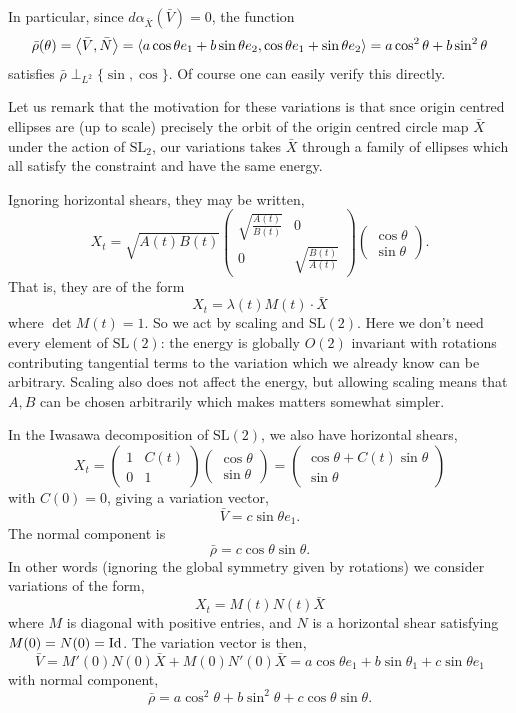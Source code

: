 \documentclass[12pt]{article}
\begin{document}
In particular, since \(d\alpha_{\bar{X}} (\bar{V}) = 0\), the function
\[
\bar{\rho} (\theta) = \left\langle{\bar{V}},{\bar{N}}\right\rangle = \left\langle{a \cos\theta e_1 + b \sin\theta e_2},{\cos\theta e_1 + \sin\theta e_2}\right\rangle = a \cos^2\theta + b \sin^2\theta
\]
satisfies \(\bar{\rho} \perp_{L^2} \{\sin, \cos\}\). Of course one can easily verify this directly.

Let us remark that the motivation for these variations is that snce origin centred ellipses are (up to scale) precisely the orbit of the origin centred circle map \(\bar{X}\) under the action of \(\text{SL}_2\), our variations takes \(\bar{X}\) through a family of ellipses which all satisfy the constraint and have the same energy.

Ignoring horizontal shears, they may be written,
\[
X_t = \sqrt{A(t) B(t)}
\begin{pmatrix}
\sqrt{\frac{A(t)}{B(t)}} & 0 \\
0 & \sqrt{\frac{B(t)}{A(t)}}
\end{pmatrix}
\begin{pmatrix}
\cos \theta \\
\sin \theta
\end{pmatrix}.
\]
That is, they are of the form
\[
X_t = \lambda(t) M(t) \cdot \bar{X}
\]
where \(\det M(t) = 1\). So we act by scaling and \(\text{SL}(2)\). Here we don't need every element of \(\text{SL}(2)\): the energy is globally \(O(2)\) invariant with rotations contributing tangential terms to the variation which we already know can be arbitrary. Scaling also does not affect the energy, but allowing scaling means that \(A, B\) can be chosen arbitrarily which makes matters somewhat simpler.

In the Iwasawa decomposition of \(\text{SL}(2)\), we also have horizontal shears,
\[
X_t = 
\begin{pmatrix}
1 & C(t) \\
0 & 1
\end{pmatrix}
\begin{pmatrix}
\cos \theta \\
\sin \theta
\end{pmatrix}
=
\begin{pmatrix}
\cos\theta + C(t) \sin\theta \\
\sin\theta
\end{pmatrix}
\]
with \(C(0) = 0\), giving a variation vector,
\[
\bar{V} = c \sin\theta e_1.
\]
The normal component is
\[
\bar{\rho} = c \cos\theta \sin\theta.
\]
In other words (ignoring the global symmetry given by rotations) we consider variations of the form,
\[
X_t = M(t) N(t) \bar{X}
\]
where \(M\) is diagonal with positive entries, and \(N\) is a horizontal shear satisfying \(M(0) = N(0) = \operatorname{Id}\). The variation vector is then,
\[
\bar{V} = M'(0) N(0) \bar{X} + M(0) N'(0) \bar{X} = a \cos\theta e_1 + b \sin\theta_1 + c \sin\theta e_1
\]
with normal component,
\[
\bar{\rho} = a \cos^2\theta + b \sin^2 \theta + c \cos\theta \sin\theta.
\]
\end{document}
